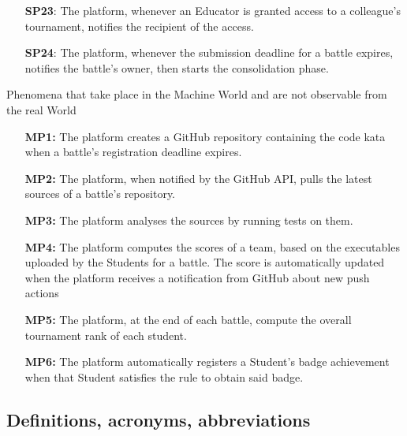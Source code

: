 \documentclass{article}
\newcounter{subsubsubsection}[subsubsection]
\begin{document}
\begin{itemize}
\begin{enumerate}
                    \begin{enumerate}
                        \item[\textbf{SP23}:] The platform, whenever an Educator is granted access to a colleague's tournament, notifies the recipient of the access.
                        \item[\textbf{SP24}:] The platform, whenever the submission deadline for a battle expires, notifies the battle's owner, then starts the
                         consolidation phase.
                    \end{enumerate}
          \end{enumerate}
\end{itemize}

Phenomena that take place in the Machine World and are not observable from the real World
\begin{enumerate}
    \item[\textbf{MP1:}] The platform creates a GitHub repository containing the code kata when a battle's registration deadline expires.
    \item[\textbf{MP2:}] The platform, when notified by the GitHub API, pulls the latest sources of a battle's repository.
    \item[\textbf{MP3:}] The platform analyses the sources by running tests on them.
    \item[\textbf{MP4:}] The platform computes the scores of a team, based on the executables uploaded by the Students for a battle. 
    The score is automatically updated when the platform receives a notification from GitHub about new push actions%
    \item[\textbf{MP5:}] The platform, at the end of each battle, compute the overall tournament rank of each student.
    \item[\textbf{MP6:}] The platform automatically registers a Student's badge achievement when that Student satisfies the rule to obtain said badge.
\end{enumerate}


\subsection{Definitions, acronyms, abbreviations}
\end{document}
